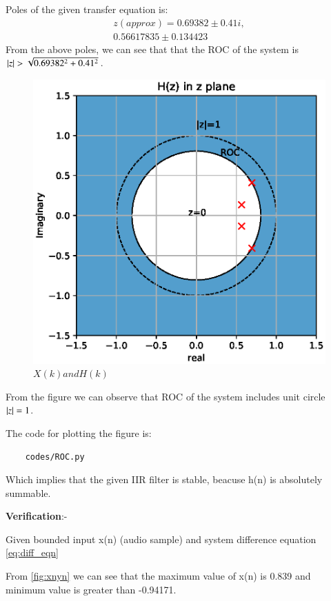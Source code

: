 \documentclass[journal,12pt,twocolumn]{IEEEtran}
\renewcommand\thesection{\arabic{section}}
\begin{document}
\begin{enumerate}[label=\thesection.\arabic*,ref=\thesection.\theenumi]
Poles of the given transfer equation is:
\begin{equation}
\begin{split}
z(approx) = 0.69382 \pm 0.41i,
\\
 0.56617835 \pm 0.134423
\end{split}  
\end{equation}
From the above poles, we can see that that the ROC of the system is $\left\vert z\right\vert>\sqrt{0.69382^{2}+0.41^{2}}$.
\begin{figure}[!ht]
\centering
\includegraphics[width=\columnwidth]{./figs/ROC.eps}
\caption{$X(k) and H(k)$}
\label{fig:xnhnfft}
\end{figure}
From the figure we can observe that ROC of the system includes unit circle $\left\vert z\right\vert=1$.

The code for plotting the figure is:
\begin{lstlisting}
    codes/ROC.py
\end{lstlisting}

Which implies that the given IIR filter is stable, beacuse h(n) is absolutely summable.

\textbf{Verification}:-

Given bounded input x(n) (audio sample) and system difference equation \ref{eq:diff_eqn}

From \ref{fig:xnyn} we can see that the maximum value of x(n) is 0.839 and minimum value is greater than -0.94171.


\end{enumerate}
\end{document}
